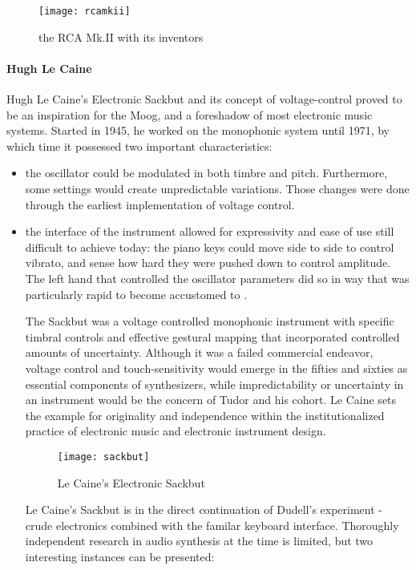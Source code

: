 	\begin{figure}[h!]
	  \caption{the RCA Mk.II with its inventors}
	  \centering
	    \texttt{[image: rcamkii]}
	\end{figure}

\paragraph{Hugh Le Caine}

Hugh Le Caine’s Electronic Sackbut and its concept of voltage-control proved to be an inspiration for the Moog, and a foreshadow of most electronic music systems. Started in 1945, he worked on the monophonic system until 1971, by which time it possessed two important characteristics: 
\begin{itemize}
	\item the oscillator could be modulated in both timbre and pitch. Furthermore, some settings would create unpredictable variations. Those changes were done through the earliest implementation of voltage control. 
	\item the interface of the instrument allowed for expressivity and ease of use still difficult to achieve today: the piano keys could move side to side to control vibrato, and sense how hard they were pushed down to control amplitude. The left hand that controlled the oscillator parameters did so in way that was particularly rapid to become accustomed to \cite{holmes2002}. 
	
	The Sackbut was a voltage controlled monophonic instrument with specific timbral controls and effective gestural mapping that incorporated controlled amounts of uncertainty. Although it was a failed commercial endeavor, voltage control and touch-sensitivity would emerge in the fifties and sixties as essential components of synthesizers, while impredictability or uncertainty in an instrument would be the concern of Tudor and his cohort. Le Caine sets the example for originality and independence within the institutionalized practice of electronic music and electronic instrument design\cite[p.147]{holmes2002}. 

	\begin{figure}[h!]
	  \caption{Le Caine's Electronic Sackbut}
	  \centering
	    \texttt{[image: sackbut]}
	\end{figure}

Le Caine's Sackbut is in the direct continuation of Dudell's experiment - crude electronics combined with the familar keyboard interface. Thoroughly independent research in audio synthesis at the time is limited, but two interesting instances can be presented: 


\end{itemize}
